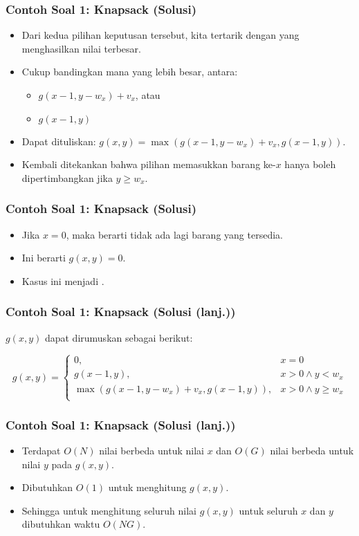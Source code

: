 \begin{frame} 
\frametitle{Contoh Soal 1: Knapsack (Solusi)}
\begin{itemize}
  \item Dari kedua pilihan keputusan tersebut, kita tertarik dengan yang menghasilkan nilai terbesar.
  \item Cukup bandingkan mana yang lebih besar, antara:
  \begin{itemize}
    \item $g(x-1, y-w_x) + v_x$, atau
    \item $g(x-1, y)$
  \end{itemize}
  \item Dapat dituliskan: $g(x, y) = \max(g(x-1,y-w_x)+v_x,g(x-1,y))$. \newline
  \item Kembali ditekankan bahwa pilihan memasukkan barang ke-$x$ hanya boleh dipertimbangkan jika $y \geq w_x$.
\end{itemize}
\end{frame}

\begin{frame} 
\frametitle{Contoh Soal 1: Knapsack (Solusi)}
\begin{itemize}
  \item Jika $x=0$, maka berarti tidak ada lagi barang yang tersedia. 
  \item Ini berarti $g(x,y) = 0$.
  \item Kasus ini menjadi \fbasecase.
\end{itemize}
\end{frame}

\begin{frame} 
\frametitle{Contoh Soal 1: Knapsack (Solusi (lanj.))}
$g(x,y)$ dapat dirumuskan sebagai berikut:
\begin{small}
\[g(x,y) = \left\{\begin{array}{lr}
    0, & x = 0\\
    g(x-1,y), & x > 0 \wedge y < w_x\\
    \max(g(x-1,y-w_x)+v_x,g(x-1,y)), & x > 0 \wedge y \geq w_x\\
    \end{array}\right.\]
\end{small}
\end{frame}

\begin{frame} 
\frametitle{Contoh Soal 1: Knapsack (Solusi (lanj.))}
\begin{itemize}
  \item Terdapat $O(N)$ nilai berbeda untuk nilai $x$ dan $O(G)$ nilai berbeda untuk nilai $y$ pada $g(x,y)$.
  \item Dibutuhkan $O(1)$ untuk menghitung $g(x,y)$. 
  \item Sehingga untuk menghitung seluruh nilai $g(x,y)$ untuk seluruh $x$ dan $y$ dibutuhkan waktu $O(NG)$.
\end{itemize}
\end{frame}

